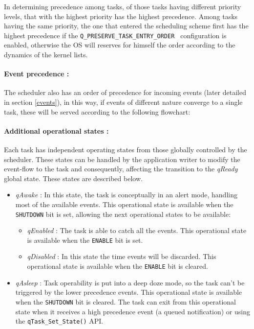 \documentclass{article}
\begin{document}
In determining precedence among tasks, of those tasks having different priority levels, that with the highest priority has the highest precedence. Among tasks having the same priority, the one that entered the scheduling scheme first has the highest precedence if the \lstinline{Q_PRESERVE_TASK_ENTRY_ORDER } configuration is enabled, otherwise the OS will reserves for himself the order according to the dynamics of the kernel lists.

\paragraph{Event precedence :}
The scheduler also has an order of precedence for incoming events (later detailed in section \ref{events}), in this way, if events of different nature converge to a single task, these will be served according to the following flowchart:



\paragraph{Additional operational states :}
Each task has independent operating states from those globally controlled by the scheduler. These states can be handled by the application writer to modify the event-flow to the task and consequently, affecting the transition to the \textit{qReady} global state. These states are described below.

\begin{itemize}
    \item \textit{qAwake} : In this state, the task is conceptually in an alert mode, handling most of the available events. This operational state is available when the \lstinline{SHUTDOWN} bit is set, allowing the next operational states to be available:
    \begin{itemize}
        \item \textit{qEnabled} : The task is able to catch all the events. This operational state is available when the \lstinline{ENABLE} bit is set.
        \item \textit{qDisabled} : In this state the time events will be discarded. This operational state is available when the \lstinline{ENABLE} bit is cleared.
    \end{itemize}
    \item \textit{qAsleep} : Task operability is put into a deep doze mode, so the task can't be triggered by the lower precedence events.  This operational state is available when the \lstinline{SHUTDOWN} bit is cleared. The task can exit from this operational state when it receives a high precedence event (a queued notification) or using the \lstinline{qTask_Set_State()} API.
\end{itemize}
\end{document}
